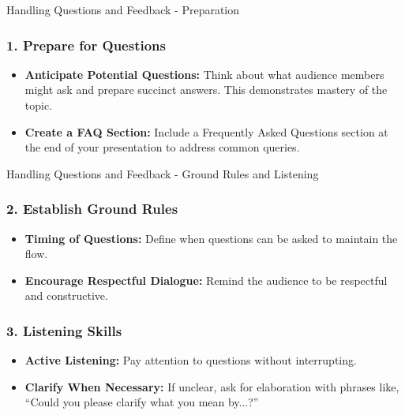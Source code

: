 \documentclass[aspectratio=169]{beamer}
\begin{document}
\begin{frame}[fragile]{Handling Questions and Feedback - Preparation}
    \frametitle{1. Prepare for Questions}
    
    \begin{itemize}
        \item \textbf{Anticipate Potential Questions:} Think about what audience members might ask and prepare succinct answers. This demonstrates mastery of the topic.
        
        \item \textbf{Create a FAQ Section:} Include a Frequently Asked Questions section at the end of your presentation to address common queries.
    \end{itemize}
\end{frame}

\begin{frame}[fragile]{Handling Questions and Feedback - Ground Rules and Listening}
    \frametitle{2. Establish Ground Rules}
    
    \begin{itemize}
        \item \textbf{Timing of Questions:} Define when questions can be asked to maintain the flow.
        
        \item \textbf{Encourage Respectful Dialogue:} Remind the audience to be respectful and constructive.
    \end{itemize}
    
    \vspace{0.5cm} %
    
    \frametitle{3. Listening Skills}
    
    \begin{itemize}
        \item \textbf{Active Listening:} Pay attention to questions without interrupting.
        
        \item \textbf{Clarify When Necessary:} If unclear, ask for elaboration with phrases like, “Could you please clarify what you mean by...?”
    \end{itemize}
\end{frame}
\end{document}
